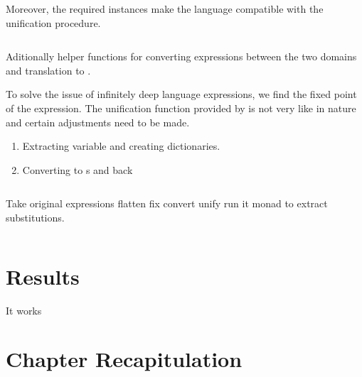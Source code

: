 \documentclass[thesis-solanki.tex]{subfiles}
\begin{document}
Moreover, the required instances make the language compatible with the unification procedure.

\begin{singlespace}
  \inputminted[linenos]{haskell}{haskell-proto2-starry-forked.hs}
\end{singlespace}

Aditionally helper functions for converting expressions between the two domains and translation to .

To solve the issue of infinitely deep language expressions, we find the fixed point of the expression.
The unification function provided by \cite{prolog-lib} is not very  like in
nature and certain adjustments need to be made.
\begin{enumerate}
\item Extracting variable and creating dictionaries.

\item Converting to s and back
\end{enumerate}

\begin{singlespace}
  \inputminted[linenos]{haskell}{haskell-proto2-clean-lemur.hs}
\end{singlespace}

Take original expressions flatten fix convert unify
run it  monad to extract substitutions.

\begin{singlespace}
  \inputminted[linenos]{haskell}{haskell-proto2-hearty-kayo.hs}
\end{singlespace}



\section{Results}

It works



\section{Chapter Recapitulation}

\ifMain
\begin{scope}
  \nolinenumbers
  \enotesize
  \par
  \begin{singlespace}
  \setlength{\parskip}{12pt plus 2pt minus 1pt}
  \theendnotes
  \par
  \end{singlespace}
\end{scope}
\fi
\end{document}
